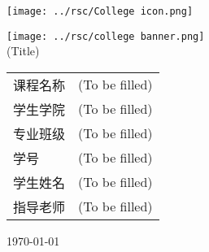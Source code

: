 \begin{titlepage}
    \texttt{[image: ../rsc/College icon.png]}
    \begin{center}
        \vspace{1cm}
        \texttt{[image: ../rsc/college banner.png]}\\
        \vspace{2cm}
        {
            \selectfont \Huge{(Title)}\\
        }
        \vspace{3cm}
        \Large
        \begin{tabular}{l c}
            课程名称 & (To be filled)\\ \cline{2-2}
            学生学院 & (To be filled)\\ \cline{2-2}
            专业班级 & (To be filled)\\ \cline{2-2}
            学号 & (To be filled)\\ \cline{2-2}
            学生姓名 & (To be filled)\\ \cline{2-2}
            指导老师 & (To be filled)\\ \cline{2-2}
        \end{tabular}
        \vfill
        \today
        \vspace{4cm}
    \end{center}
\end{titlepage}

\newpage
\null
\thispagestyle{empty}

\newpage
{}
\tableofcontents
\thispagestyle{empty}
\newpage
\setcounter{page}{1}
